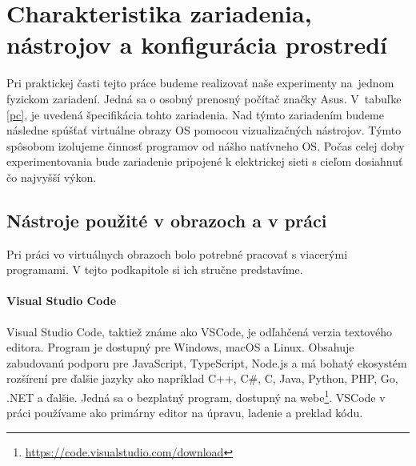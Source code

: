 \chapter{Charakteristika zariadenia, nástrojov a konfigurácia prostredí}
Pri praktickej časti tejto práce budeme realizovať naše experimenty na~jednom fyzickom zariadení. Jedná sa o osobný prenosný počítač značky Asus. V~tabuľke \ref{pc}, je uvedená špecifikácia tohto zariadenia. Nad týmto zariadením budeme následne spúšťať virtuálne obrazy OS pomocou vizualizačných nástrojov. Týmto spôsobom izolujeme činnosť programov od nášho natívneho OS. Počas celej doby experimentovania bude zariadenie pripojené k elektrickej sieti s cieľom dosiahnuť čo najvyšší výkon.

\begin{table}[!h]
	\centering
	\caption{Technická špecifikácia použitého fyzického zariadenia}\label{pc}
\end{table}

\section{Nástroje použité v obrazoch a v práci}
Pri práci vo virtuálnych obrazoch bolo potrebné pracovať s viacerými programami. V tejto podkapitole si ich stručne predstavíme.  
\subsubsection{Visual Studio Code}
Visual Studio Code, taktiež známe ako VSCode, je odľahčená verzia textového editora. Program je dostupný pre Windows, macOS a Linux. Obsahuje zabudovanú podporu pre JavaScript, TypeScript, Node.js a má bohatý ekosystém rozšírení pre ďalšie jazyky ako napríklad C++, C\#, C, Java, Python, PHP, Go, .NET a ďalšie. Jedná sa o bezplatný program, dostupný na webe\footnote{\url{https://code.visualstudio.com/download}}. VSCode v práci používame ako primárny editor na úpravu, ladenie a preklad kódu.   
